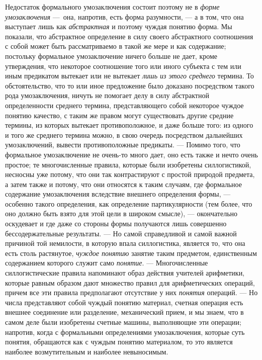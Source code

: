 \documentclass[twoside]{article}
\begin{document}
{{{{{Недостаток формального умозаключения состоит поэтому не в
{\em форме умозаключения}
—~она, напротив, есть форма разумности, — а в
том, что она выступает лишь как
{\em абстрактная} и
поэтому чуждая понятию форма. Мы показали, что абстрактное определение в
силу своего абстрактного соотношения с собой может быть рассматриваемо в
такой же мере и как содержание; постольку формальное умозаключение ничего
больше не дает, кроме утверждения, что некоторое соотношение того или иного
субъекта с тем или иным предикатом вытекает или не вытекает
{\em лишь из этого среднего}
термина. То обстоятельство, что то или иное предложение было
доказано посредством такого рода умозаключения, ничуть не помогает делу в
силу абстрактной определенности среднего термина, представляющего собой
некоторое чуждое понятию качество, с таким же правом могут существовать
другие средние термины, из которых вытекает противоположное, и даже больше
того: из одного и того же среднего термина можно, в свою очередь
посредством дальнейших умозаключений, вывести противоположные предикаты. —
Помимо того, что формальное умозаключение не очень-то много
дает, оно есть также и нечто очень простое; те многочисленные правила,
которые были изобретены силлогистикой, несносны уже потому, что они так
контрастируют с простой природой предмета, а затем также и потому, что они
относятся к таким случаям, где формальное содержание
умозаключения вследствие внешнего определения формы, —
особенно такого определения, как определение партикулярности
(тем более, что оно должно быть взято для этой цели в широком смысле), —
окончательно оскудевает и где даже со стороны формы
получаются лишь совершенно бессодержательные результаты. —
Но самой справедливой и самой важной причиной той немилости,
в которую впала силлогистика, является то, что она есть столь растянутое,
{\em чуждое понятию}
занятие таким предметом, единственным содержанием которого
служит само {\em понятие}. —
Многочисленные силлогистические правила напоминают образ
действия учителей арифметики, которые равным образом дают множество правил
для арифметических операций, причем все эти правила предполагают отсутствие
у них {\em понятия}
операций. — Но числа представляют собой чуждый
понятию материал, счетная операция есть внешнее соединение или разделение,
механический прием, и мы знаем, что в самом деле были изобретены счетные
машины, выполняющие эти операции; напротив, когда с формальными
определениями умозаключения, которые суть понятия, обращаются как с чуждым
понятию материалом, то это является наиболее возмутительным и наиболее
невыносимым.

}}}}}
\end{document}

